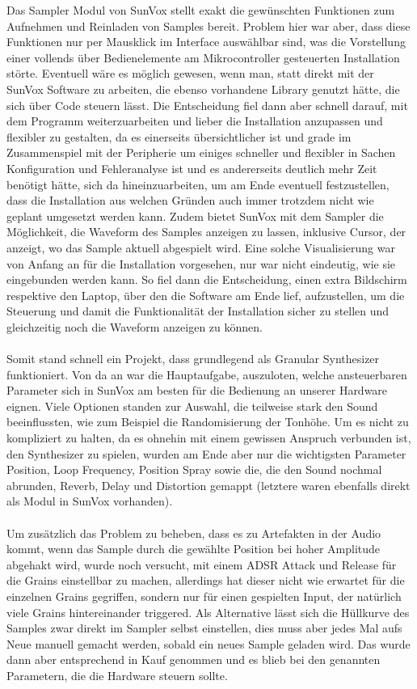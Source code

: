 \documentclass[12pt]{scrartcl}%
\theoremstyle{nonumberplain}
\begin{document}
Das Sampler Modul von SunVox stellt exakt die gewünschten Funktionen zum Aufnehmen und Reinladen von Samples bereit. Problem hier war aber, dass diese Funktionen nur per Mausklick im Interface auswählbar sind, was die Vorstellung einer vollends über Bedienelemente am Mikrocontroller gesteuerten Installation störte. Eventuell wäre es möglich gewesen, wenn man, statt direkt mit der SunVox Software zu arbeiten, die ebenso vorhandene Library genutzt hätte, die sich über Code steuern lässt. Die Entscheidung fiel dann aber schnell darauf, mit dem Programm weiterzuarbeiten und lieber die Installation anzupassen und flexibler zu gestalten, da es einerseits übersichtlicher ist und grade im Zusammenspiel mit der Peripherie um einiges schneller und flexibler in Sachen Konfiguration und Fehleranalyse ist und es andererseits deutlich mehr Zeit benötigt hätte, sich da hineinzuarbeiten, um am Ende eventuell festzustellen, dass die Installation aus welchen Gründen auch immer trotzdem nicht wie geplant umgesetzt werden kann. Zudem bietet SunVox mit dem Sampler die Möglichkeit, die Waveform des Samples anzeigen zu lassen, inklusive Cursor, der anzeigt, wo das Sample aktuell abgespielt wird. Eine solche Visualisierung war von Anfang an für die Installation vorgesehen, nur war nicht eindeutig, wie sie eingebunden werden kann. So fiel dann die Entscheidung, einen extra Bildschirm respektive den Laptop, über den die Software am Ende lief, aufzustellen, um die Steuerung und damit die Funktionalität der Installation sicher zu stellen und gleichzeitig noch die Waveform anzeigen zu können.
\\\\
Somit stand schnell ein Projekt, dass grundlegend als Granular Synthesizer funktioniert. Von da an war die Hauptaufgabe, auszuloten, welche ansteuerbaren Parameter sich in SunVox am besten für die Bedienung an unserer Hardware eignen. Viele Optionen standen zur Auswahl, die teilweise stark den Sound beeinflussten, wie zum Beispiel die Randomisierung der Tonhöhe. Um es nicht zu kompliziert zu halten, da es ohnehin mit einem gewissen Anspruch verbunden ist, den Synthesizer zu spielen, wurden am Ende aber nur die wichtigsten Parameter Position, Loop Frequency, Position Spray sowie die, die den Sound nochmal abrunden, Reverb, Delay und Distortion gemappt (letztere waren ebenfalls direkt als Modul in SunVox vorhanden).
\\\\
Um zusätzlich das Problem zu beheben, dass es zu Artefakten in der Audio kommt, wenn das Sample durch die gewählte Position bei hoher Amplitude abgehakt wird, wurde noch versucht, mit einem ADSR Attack und Release für die Grains einstellbar zu machen, allerdings hat dieser nicht wie erwartet für die einzelnen Grains gegriffen, sondern nur für einen gespielten Input, der natürlich viele Grains hintereinander triggered. Als Alternative lässt sich die Hüllkurve des Samples zwar direkt im Sampler selbst einstellen, dies muss aber jedes Mal aufs Neue manuell gemacht werden, sobald ein neues Sample geladen wird. Das wurde dann aber entsprechend in Kauf genommen und es blieb bei den genannten Parametern, die die Hardware steuern sollte.
\end{document}
